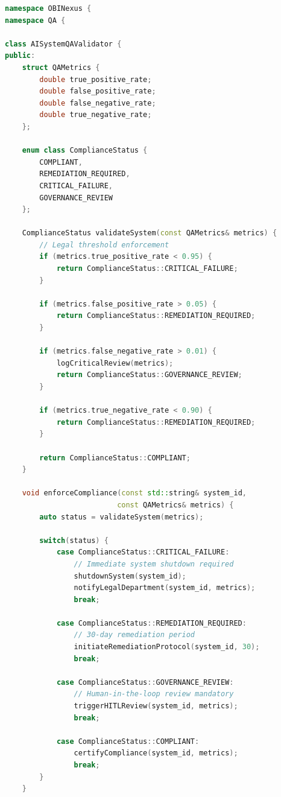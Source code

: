 \documentclass[12pt,a4paper]{article}
\begin{document}
\begin{lstlisting}[language=C++, caption=Mandatory QA Validation Framework]
namespace OBINexus {
namespace QA {

class AISystemQAValidator {
public:
    struct QAMetrics {
        double true_positive_rate;
        double false_positive_rate;
        double false_negative_rate;
        double true_negative_rate;
    };

    enum class ComplianceStatus {
        COMPLIANT,
        REMEDIATION_REQUIRED,
        CRITICAL_FAILURE,
        GOVERNANCE_REVIEW
    };

    ComplianceStatus validateSystem(const QAMetrics& metrics) {
        // Legal threshold enforcement
        if (metrics.true_positive_rate < 0.95) {
            return ComplianceStatus::CRITICAL_FAILURE;
        }
        
        if (metrics.false_positive_rate > 0.05) {
            return ComplianceStatus::REMEDIATION_REQUIRED;
        }
        
        if (metrics.false_negative_rate > 0.01) {
            logCriticalReview(metrics);
            return ComplianceStatus::GOVERNANCE_REVIEW;
        }
        
        if (metrics.true_negative_rate < 0.90) {
            return ComplianceStatus::REMEDIATION_REQUIRED;
        }
        
        return ComplianceStatus::COMPLIANT;
    }

    void enforceCompliance(const std::string& system_id, 
                          const QAMetrics& metrics) {
        auto status = validateSystem(metrics);
        
        switch(status) {
            case ComplianceStatus::CRITICAL_FAILURE:
                // Immediate system shutdown required
                shutdownSystem(system_id);
                notifyLegalDepartment(system_id, metrics);
                break;
                
            case ComplianceStatus::REMEDIATION_REQUIRED:
                // 30-day remediation period
                initiateRemediationProtocol(system_id, 30);
                break;
                
            case ComplianceStatus::GOVERNANCE_REVIEW:
                // Human-in-the-loop review mandatory
                triggerHITLReview(system_id, metrics);
                break;
                
            case ComplianceStatus::COMPLIANT:
                certifyCompliance(system_id, metrics);
                break;
        }
    }


\end{lstlisting}
\end{document}
